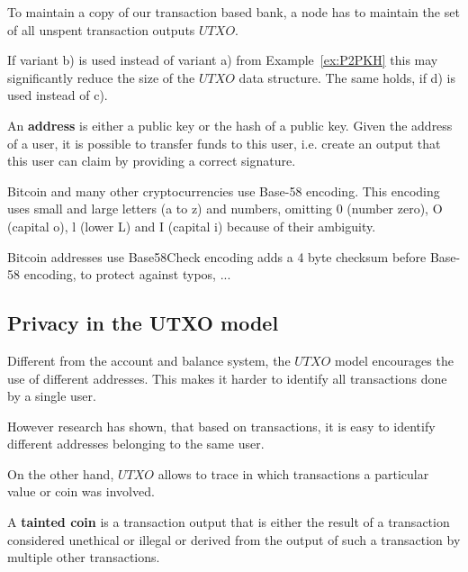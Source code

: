 \begin{note}
To maintain a copy of our transaction based bank, a node has to maintain the set of all unspent transaction outputs $UTXO$. 

If variant b) is used instead of variant a) from Example~\ref{ex:P2PKH} this may significantly reduce the size of the $UTXO$ data structure. The same holds, if d) is used instead of c).
\end{note}	


\begin{definition} An \textbf{address} is either a public key or the hash of a public key. Given the address of a user, it is possible to transfer funds to this user, i.e. create an output that this user can claim by providing a correct signature.
\end{definition}

\begin{note}
Bitcoin and many other cryptocurrencies use Base-58 encoding. This encoding uses small and large letters (a to z) and numbers, omitting 0 (number zero), O (capital o), l (lower L) and I (capital i) because of their ambiguity.

Bitcoin addresses use Base58Check encoding adds a 4 byte checksum before Base-58 encoding, to protect against typos, ...
\end{note}


\subsection{Privacy in the UTXO model}
Different from the account and balance system, the $UTXO$ model encourages the use of different addresses. This makes it harder to identify all transactions done by a single user.

However research has shown, that based on transactions, it is easy to identify different addresses belonging to the same user.

On the other hand, $UTXO$ allows to trace in which transactions a particular value or coin was involved.

\begin{definition}
A \textbf{tainted coin} is a transaction output that is either the result of a transaction considered unethical or illegal or derived from the output of such a transaction by multiple other transactions.
\end{definition}

